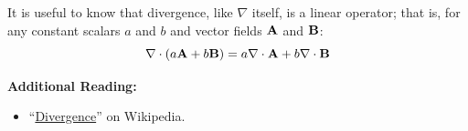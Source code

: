 It is useful to know that divergence, like $\nabla$ itself, is a linear operator; that is, for any constant scalars $a$ and $b$ and vector fields ${\bf A}$ and ${\bf B}$:
%
\begin{equation}
\nabla \cdot \left( a{\bf A} + b{\bf B} \right) = a \nabla \cdot {\bf A} + b \nabla \cdot {\bf B}
\end{equation}


{\bf Additional Reading:}
\begin{itemize}
\item ``\href{https://en.wikipedia.org/wiki/Divergence}{Divergence}'' on Wikipedia.
\end{itemize}

